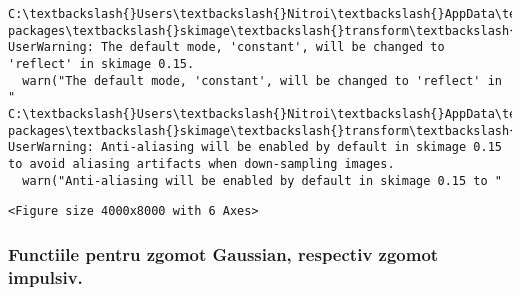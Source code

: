 \documentclass[11pt]{article}
\begin{document}
    \begin{Verbatim}[commandchars=\\\{\}]
C:\textbackslash{}Users\textbackslash{}Nitroi\textbackslash{}AppData\textbackslash{}Local\textbackslash{}Continuum\textbackslash{}anaconda3\textbackslash{}envs\textbackslash{}PAIC\textbackslash{}lib\textbackslash{}site-packages\textbackslash{}skimage\textbackslash{}transform\textbackslash{}\_warps.py:105: UserWarning: The default mode, 'constant', will be changed to 'reflect' in skimage 0.15.
  warn("The default mode, 'constant', will be changed to 'reflect' in "
C:\textbackslash{}Users\textbackslash{}Nitroi\textbackslash{}AppData\textbackslash{}Local\textbackslash{}Continuum\textbackslash{}anaconda3\textbackslash{}envs\textbackslash{}PAIC\textbackslash{}lib\textbackslash{}site-packages\textbackslash{}skimage\textbackslash{}transform\textbackslash{}\_warps.py:110: UserWarning: Anti-aliasing will be enabled by default in skimage 0.15 to avoid aliasing artifacts when down-sampling images.
  warn("Anti-aliasing will be enabled by default in skimage 0.15 to "

    \end{Verbatim}

    
    \begin{verbatim}
<Figure size 4000x8000 with 6 Axes>
    \end{verbatim}

    
    \hypertarget{functiile-pentru-zgomot-gaussian-respectiv-zgomot-impulsiv.}{%
\subsubsection{Functiile pentru zgomot Gaussian, respectiv zgomot
impulsiv.}\label{functiile-pentru-zgomot-gaussian-respectiv-zgomot-impulsiv.}}
\end{document}
